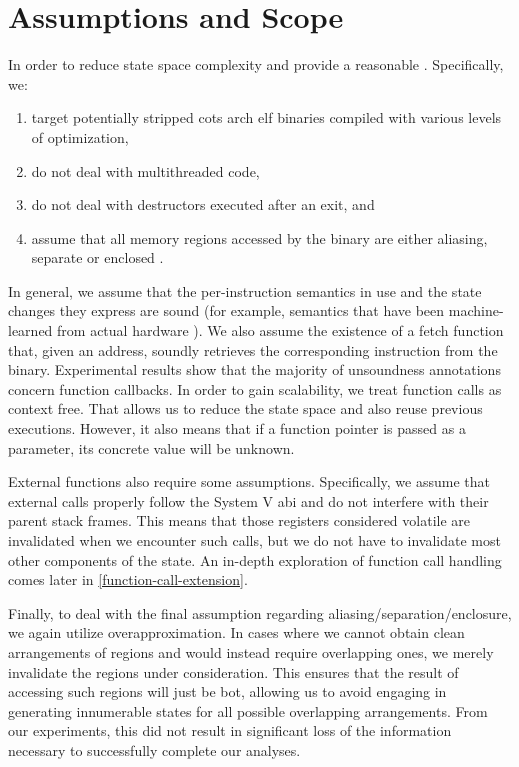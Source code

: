 \section{Assumptions and Scope}\label{hg-assumptions}
In order to reduce state space complexity and provide a reasonable .
Specifically, we:
\begin{enumerate}
  \item target potentially stripped \ac{cots} \gls{arch} \ac{elf} binaries compiled with various levels of optimization,
  \item do not deal with multithreaded code,
  \item do not deal with destructors executed after an exit, and
  \item assume that all memory regions accessed by the binary are either aliasing, separate or enclosed \autocite{balakrishnan2004analyzing,balakrishnan2005codesurfer}.
\end{enumerate}
In general, we assume that the per-instruction semantics in use and the state changes they express are sound
(for example, semantics that have been machine-learned from actual hardware \autocite{heule2016stratified,roessle2019formally}).
We also assume the existence of a \gls{fetch} function that, given an address, soundly retrieves the corresponding instruction from the binary.
Experimental results show that the majority of unsoundness annotations concern function callbacks.
In order to gain scalability, we treat function calls as context free.
That allows us to reduce the state space and also reuse previous executions.
However, it also means that if a function pointer is passed as a parameter, its concrete value will be unknown.

External functions also require some assumptions.
Specifically, we assume that external calls properly follow the System V \ac{abi} and do not interfere with their parent stack frames.
This means that those registers considered volatile are invalidated when we encounter such calls, but we do not have to invalidate most other components of the state.
An in-depth exploration of function call handling comes later in \cref{function-call-extension}.

Finally, to deal with the final assumption regarding aliasing/separation/enclosure, we again utilize overapproximation.
In cases where we cannot obtain clean arrangements of regions and would instead require overlapping ones, we merely invalidate the regions under consideration.
This ensures that the result of accessing such regions will just be \gls{bot}, allowing us to avoid engaging in generating innumerable states for all possible overlapping arrangements.
From our experiments, this did not result in significant loss of the information necessary to successfully complete our analyses.

